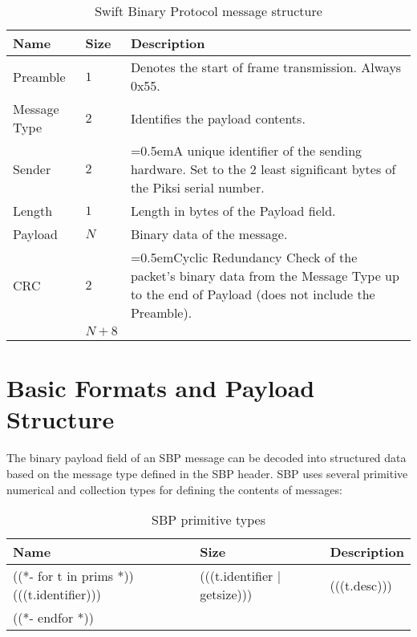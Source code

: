 \documentclass{article}
\numberwithin{table}{subsection}
\numberwithin{field}{subsection}
\begin{document}
\begin{table}[h]
  \centering
  \begin{tabularx}{\textwidth}{aaX}
    \toprule
    Name & Size & Description \\
    \midrule
    {Preamble} & $1$ & Denotes the start of frame transmission. Always 0x55. \\
    {Message Type} & $2$ & Identifies the payload contents. \\
    {Sender} & $2$ & \hangindent=0.5em{A unique identifier of the sending hardware. Set to the 2 least significant bytes of the Piksi serial number.} \\
    {Length} & $1$ & Length in bytes of the {Payload} field. \\
    {Payload} & $N$ & Binary data of the message. \\
    {CRC} & $2$ & \hangindent=0.5em{Cyclic Redundancy Check of the packet's binary data from the Message Type up to the end of Payload (does not include the Preamble).} \\
    \midrule
    & $N+8$ \\
    \bottomrule
  \end{tabularx}
  \caption{Swift Binary Protocol message structure}
  \label{tab:message}
\end{table}
\newpage

\section{Basic Formats and Payload Structure}
\label{sec:Payload}

The binary payload field of an SBP message can be decoded into
structured data based on the message type defined in the SBP
header. SBP uses several primitive numerical and collection types for
defining the contents of messages:

\begin{table}[h]
  \centering
  \begin{tabularx}{0.70\textwidth}{aaX}
    \toprule
    Name & Size & Description \\
    \midrule
    ((*- for t in prims *))
    (((t.identifier))) & (((t.identifier | getsize))) & (((t.desc))) \\
    ((*- endfor *))
    \bottomrule
  \end{tabularx}
  \caption{SBP primitive types}
  \label{tab:types}
\end{table}
\end{document}

